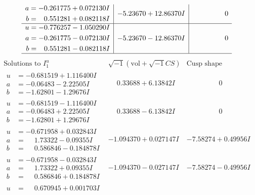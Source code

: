\documentclass[1p]{elsarticle_modified}
\theoremstyle{definition}
\newcommand{\I}{\sqrt{-1}}
\begin{document}
$$\begin{array}{c|c|c}
\begin{aligned}
a &= -0.261775 + 0.072130 I \\
b &= \phantom{-}0.551281 + 0.082118 I\end{aligned}
 & -5.23670 + 12.86370 I & \phantom{-0.000000 } 0 \\ \hline\begin{aligned}
u &= -0.776257 - 1.050290 I \\
a &= -0.261775 - 0.072130 I \\
b &= \phantom{-}0.551281 - 0.082118 I\end{aligned}
 & -5.23670 - 12.86370 I & \phantom{-0.000000 } 0\\
 \hline 
 \end{array}$$\newpage$$\begin{array}{c|c|c}  
\text{Solutions to }I^u_{1}& \I (\text{vol} + \sqrt{-1}CS) & \text{Cusp shape}\\
 \hline 
\begin{aligned}
u &= -0.681519 + 1.116400 I \\
a &= -0.06483 - 2.22505 I \\
b &= -1.62801 - 1.29676 I\end{aligned}
 & \phantom{-}0.33688 + 6.13842 I & \phantom{-0.000000 } 0 \\ \hline\begin{aligned}
u &= -0.681519 - 1.116400 I \\
a &= -0.06483 + 2.22505 I \\
b &= -1.62801 + 1.29676 I\end{aligned}
 & \phantom{-}0.33688 - 6.13842 I & \phantom{-0.000000 } 0 \\ \hline\begin{aligned}
u &= -0.671958 + 0.032843 I \\
a &= \phantom{-}1.73322 - 0.09355 I \\
b &= \phantom{-}0.586846 - 0.184878 I\end{aligned}
 & -1.094370 + 0.027147 I & -7.58274 + 0.49956 I \\ \hline\begin{aligned}
u &= -0.671958 - 0.032843 I \\
a &= \phantom{-}1.73322 + 0.09355 I \\
b &= \phantom{-}0.586846 + 0.184878 I\end{aligned}
 & -1.094370 - 0.027147 I & -7.58274 - 0.49956 I \\ \hline\begin{aligned}
u &= \phantom{-}0.670945 + 0.001703 I \\

\end{aligned}
\end{array}$$
\end{document}
